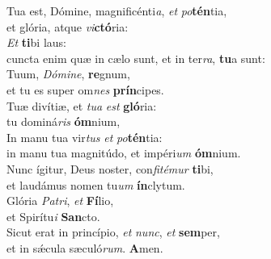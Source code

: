 \evenverse Tua est, Dómine, magnificénti\textit{a}, \textit{et} \textit{po}\textbf{tén}tia,~\*\\
\evenverse et glória, atque \textit{vi}\textbf{ctó}ria:\\
\oddverse \textit{Et} \textbf{ti}bi laus:~\*\\
\oddverse cuncta enim quæ in cælo sunt, et in ter\textit{ra}, \textbf{tu}a sunt:\\
\evenverse Tuum, \textit{Dó}\textit{mi}\textit{ne}, \textbf{re}gnum,~\*\\
\evenverse et tu es super om\textit{nes} \textbf{prín}cipes.\\
\oddverse Tuæ divítiæ, et \textit{tu}\textit{a} \textit{est} \textbf{gló}ria:~\*\\
\oddverse tu dominá\textit{ris} \textbf{óm}nium,\\
\evenverse In manu tua vir\textit{tus} \textit{et} \textit{po}\textbf{tén}tia:~\*\\
\evenverse in manu tua magnitúdo, et impéri\textit{um} \textbf{óm}nium.\\
\oddverse Nunc ígitur, Deus noster, con\textit{fi}\textit{té}\textit{mur} \textbf{ti}bi,~\*\\
\oddverse et laudámus nomen tu\textit{um} \textbf{ín}clytum.\\
\evenverse Glória \textit{Pa}\textit{tri}, \textit{et} \textbf{Fí}lio,~\*\\
\evenverse et Spirítu\textit{i} \textbf{San}cto.\\
\oddverse Sicut erat in princípio, \textit{et} \textit{nunc}, \textit{et} \textbf{sem}per,~\*\\
\oddverse et in sǽcula sæculó\textit{rum}. \textbf{A}men.\\
